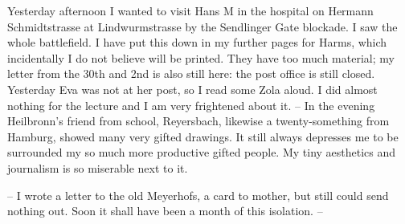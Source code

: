 
Yesterday afternoon I wanted to visit Hans M in the hospital on Hermann Schmidtstrasse at Lindwurmstrasse by the Sendlinger Gate blockade. I saw the whole battlefield. I have put this down in my further pages for Harms, which incidentally I do not believe will be printed. They have too much material; my letter from the 30th and 2nd is also still here: the post office is still closed. Yesterday Eva was not at her post, so I read some Zola aloud. I did almost nothing for the lecture and I am very frightened about it. -- In the evening Heilbronn's friend from school, Reyersbach, likewise a twenty-something from Hamburg, showed many very gifted drawings. It still always depresses me to be surrounded my so much more productive gifted people. My tiny aesthetics and journalism is so miserable next to it.

-- I wrote a letter to the old Meyerhofs, a card to mother, but still could send nothing out. Soon it shall have been a month of this isolation. -- 

